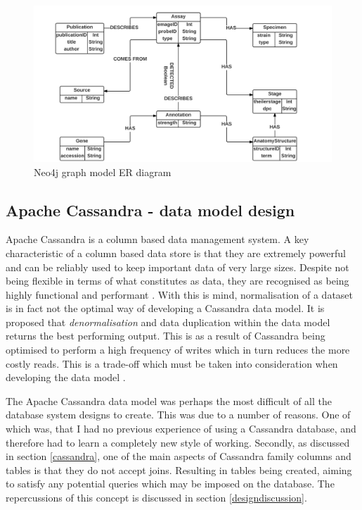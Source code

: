 \begin{figure}[H]\begin{center}\includegraphics[width=1\linewidth]{images/neo4j_model_er}\caption{Neo4j graph model ER diagram}\label{fig:neo1}\end{center}\end{figure}
\newpage
\subsection{Apache Cassandra  - data model design}
Apache Cassandra is a column based data management system. A key characteristic of a column based data store is that they are extremely powerful and can be reliably used to keep important data of very large sizes. Despite not being flexible in terms of what constitutes as data, they are recognised as being highly functional and performant \cite{cassandra}. With this is mind, normalisation of a dataset is in fact not the optimal way of developing a Cassandra data model. It is proposed that \textit{denormalisation} and data duplication within the data model returns the best performing output. This is as a result of Cassandra being optimised to perform a high frequency of writes which in turn reduces the more costly reads. This is a trade-off which must be taken into consideration when developing the data model \cite{cassandra}.

The Apache Cassandra data model was perhaps the most difficult of all the database system designs to create. This was due to a number of reasons. One of which was, that I had no previous experience of using a Cassandra database, and therefore had to learn a completely new style of working. Secondly, as discussed in section \ref{cassandra}, one of the main aspects of Cassandra family columns and tables is that they do not accept joins. Resulting in tables being created, aiming to satisfy any potential queries which may be imposed on the database. The repercussions of this concept is discussed in section \ref{designdiscussion}.

